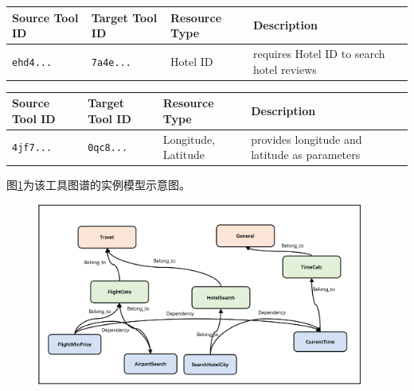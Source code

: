 \begin{table}[H]
    \centering
    \label{tab:csv-example-strong-dependency}
    \renewcommand{\arraystretch}{1.2}
    \scriptsize %
    \begin{tabular}{|l|l|l|l|}
    \hline
    \textbf{Source Tool ID} & \textbf{Target Tool ID} & \textbf{Resource Type} & \textbf{Description} \\ \hline
    \texttt{ehd4...} & \texttt{7a4e...} & Hotel ID & requires Hotel ID to search hotel reviews \\ \hline
    \end{tabular}
    \end{table}

    \begin{table}[H]
        \centering
        \label{tab:csv-example-weak-dependency}
        \renewcommand{\arraystretch}{1.2}
        \scriptsize %
        \begin{tabular}{|l|l|l|l|}
        \hline
        \textbf{Source Tool ID} & \textbf{Target Tool ID} & \textbf{Resource Type} & \textbf{Description} \\ \hline
        \texttt{4jf7...} & \texttt{0qc8...} & Longitude, Latitude & provides longitude and latitude as parameters \\ \hline
        \end{tabular}
        \end{table}

图\ref{fig:ch3-knowledge-graph-instance-model}为该工具图谱的实例模型示意图。

\begin{figure}[H]
    \vspace{1em}
    \centering
    \setlength{\abovecaptionskip}{10pt} %
    \includegraphics[height=6cm]{../assets/图谱实例模型.png}
    \label{fig:ch3-knowledge-graph-instance-model}
\end{figure}


